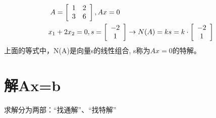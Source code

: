 \documentclass{book}
\begin{document}
\begin{equation*}
  \begin{aligned}
    A&=\left[
      \begin{array}{c c }
        1 & 2\\ 
        3 & 6
      \end{array}
    \right], 
    Ax=0\\ 
    x_1&+2x_2=0,
    s=\left[
      \begin{array}{c }
        -2\\ 
        1
      \end{array}
    \right]\rightarrow 
  N(A)=ks=k\cdot 
    \left[
      \begin{array}{c }
        -2\\ 
        1
      \end{array}
    \right]
  \end{aligned} 
  \label{eq: nullSpace}
\end{equation*}
  上面的等式中，N(A)是向量s的线性组合, s称为$Ax=0$的特解。

\section{解Ax=b} %
求解分为两部：“找通解”、“找特解”
\end{document}
